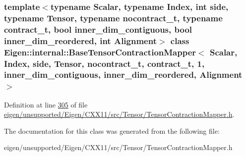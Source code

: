 \subsubsection*{template$<$typename Scalar, typename Index, int side, typename Tensor, typename nocontract\+\_\+t, typename contract\+\_\+t, bool inner\+\_\+dim\+\_\+contiguous, bool inner\+\_\+dim\+\_\+reordered, int Alignment$>$\newline
class Eigen\+::internal\+::\+Base\+Tensor\+Contraction\+Mapper$<$ Scalar, Index, side, Tensor, nocontract\+\_\+t, contract\+\_\+t, 1, inner\+\_\+dim\+\_\+contiguous, inner\+\_\+dim\+\_\+reordered, Alignment $>$}



Definition at line \hyperlink{eigen_2unsupported_2_eigen_2_c_x_x11_2src_2_tensor_2_tensor_contraction_mapper_8h_source_l00305}{305} of file \hyperlink{eigen_2unsupported_2_eigen_2_c_x_x11_2src_2_tensor_2_tensor_contraction_mapper_8h_source}{eigen/unsupported/\+Eigen/\+C\+X\+X11/src/\+Tensor/\+Tensor\+Contraction\+Mapper.\+h}.



The documentation for this class was generated from the following file\+:\begin{DoxyCompactItemize}
\item 
eigen/unsupported/\+Eigen/\+C\+X\+X11/src/\+Tensor/\+Tensor\+Contraction\+Mapper.\+h\end{DoxyCompactItemize}
